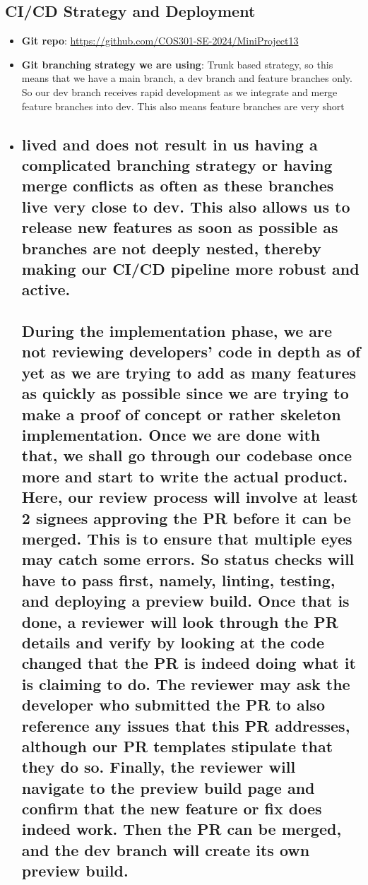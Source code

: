 \documentclass{article}
\begin{document}
\subsection{CI/CD Strategy and Deployment}
\begin{itemize}
    \item \textbf{Git repo}: \url{https://github.com/COS301-SE-2024/MiniProject13}
    \item \textbf{Git branching strategy we are using}: Trunk based strategy, so this means that we have a main branch, a dev branch and feature branches only. So our dev branch receives rapid development as we integrate and merge feature branches into dev. This also means feature branches are very short
    \item \subsection*{lived and does not result in us having a complicated branching strategy or having merge conflicts as often as these branches live very close to dev. This also allows us to release new features as soon as possible as branches are not deeply nested, thereby making our CI/CD pipeline more robust and active.}

    \subsection*{During the implementation phase, we are not reviewing developers' code in depth as of yet as we are trying to add as many features as quickly as possible since we are trying to make a proof of concept or rather skeleton implementation. Once we are done with that, we shall go through our codebase once more and start to write the actual product. Here, our review process will involve at least 2 signees approving the PR before it can be merged. This is to ensure that multiple eyes may catch some errors. So status checks will have to pass first, namely, linting, testing, and deploying a preview build. Once that is done, a reviewer will look through the PR details and verify by looking at the code changed that the PR is indeed doing what it is claiming to do. The reviewer may ask the developer who submitted the PR to also reference any issues that this PR addresses, although our PR templates stipulate that they do so. Finally, the reviewer will navigate to the preview build page and confirm that the new feature or fix does indeed work. Then the PR can be merged, and the dev branch will create its own preview build.}
    

\end{itemize}
\end{document}
